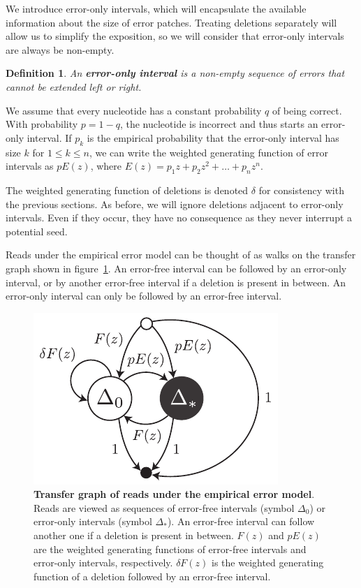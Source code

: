 \documentclass{article}
\newtheorem{definition}{Definition}
\begin{document}
We introduce error-only intervals, which will encapsulate the available
information about the size of error patches. Treating deletions separately
will allow us to simplify the exposition, so we will consider that
error-only intervals are always be non-empty.

\begin{definition}
\label{def:error-interval}
An \textbf{error-only interval} is a non-empty sequence of errors that
cannot be extended left or right.
\end{definition}

We assume that every nucleotide has a constant probability $q$ of being
correct. With probability $p = 1-q$, the nucleotide is incorrect and thus
starts an error-only interval. If  $p_k$ is the empirical probability that
the error-only interval has size $k$ for $1 \leq k \leq n$, we can write
the weighted generating function of error intervals as $pE(z)$, where
$E(z) = p_1z + p_2z^2 + \ldots + p_nz^n$.

The weighted generating function of deletions is denoted $\delta$ for
consistency with the previous sections. As before, we will ignore
deletions adjacent to error-only intervals. Even if they occur, they have
no consequence as they never interrupt a potential seed.

Reads under the empirical error model can be thought of as walks on the
transfer graph shown in figure~\ref{fig:empirical}.
An error-free interval can be followed by an error-only interval, or by
another error-free interval if a deletion is present in between. An
error-only interval can only be followed by an error-free interval.

\begin{figure}[h]
\centering
\includegraphics[scale=0.9]{empirical.pdf}
\caption{\textbf{Transfer graph of reads under the empirical error model}.
Reads are viewed as sequences of error-free intervals (symbol $\Delta_0$)
or error-only intervals (symbol $\Delta_*$). An error-free interval can
follow another one if a deletion is present in between. $F(z)$ and $pE(z)$
are the weighted generating functions of error-free intervals and
error-only intervals, respectively. $\delta F(z)$ is the weighted
generating function of a deletion followed by an error-free interval.}
\label{fig:empirical}
\end{figure}
\end{document}
